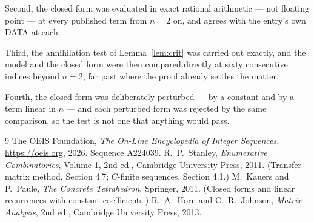 \documentclass[11pt,a4paper]{article}
\theoremstyle{plain}
\theoremstyle{definition}
\begin{document}
Second, the closed form was evaluated in exact rational arithmetic --- not floating point ---
at every published term from $n=2$ on, and agrees with the entry's own DATA at each.

Third, the annihilation test of Lemma~\ref{lem:crit} was carried out exactly, and the model
and the closed form were then compared directly at sixty consecutive indices beyond
$n=2$, far past where the proof already settles the matter.

Fourth, the closed form was deliberately perturbed --- by a constant and by a term linear in
$n$ --- and each perturbed form was rejected by the same comparison, so the test is not one
that anything would pass.

\begin{thebibliography}{9}
 The OEIS Foundation, \emph{The On-Line Encyclopedia of Integer
Sequences}, \url{https://oeis.org}, 2026. Sequence A224039.
 R.~P.~Stanley, \emph{Enumerative Combinatorics}, Volume 1, 2nd ed.,
Cambridge University Press, 2011. (Transfer-matrix method, Section 4.7; $C$-finite sequences,
Section 4.1.)
 M.~Kauers and P.~Paule, \emph{The Concrete Tetrahedron}, Springer, 2011.
(Closed forms and linear recurrences with constant coefficients.)
 R.~A.~Horn and C.~R.~Johnson, \emph{Matrix Analysis}, 2nd ed., Cambridge
University Press, 2013.
\end{thebibliography}
\end{document}
